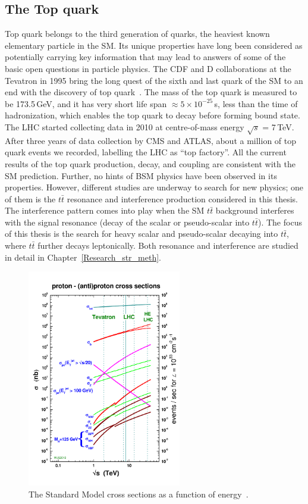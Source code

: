\subsection{The Top quark}\label{subsec:top_quark}
Top quark belongs to the third generation of quarks, the heaviest known elementary particle in the SM. Its unique properties have long been considered as potentially carrying key information that may lead to answers of some of the basic open questions in particle physics. The CDF and D collaborations at the Tevatron in 1995 bring the long quest of the sixth and last quark of the SM to an end with the discovery of top quark~\cite{top_quark}. The mass of the top quark is measured to be 173.5\,GeV, and it has very short life span $\approx 5 \times 10^{-25}$\,s, less than the time of hadronization, which enables the top quark to decay before forming bound state. The LHC started collecting data in 2010 at centre-of-mass energy $\sqrt{s}$ = 7\,TeV. After three years of data collection by CMS and ATLAS, about a million of top quark events we recorded, labelling the LHC as “top factory”. All the current results of the top quark production, decay, and coupling are consistent with the SM prediction. Further, no hints of BSM physics have been observed in its properties. However, different studies are underway to search for new physics; one of them is the $t\bar{t}$ resonance and interference production considered in this thesis. The interference pattern comes into play when the SM $t\bar{t}$ background interferes with the signal resonance (decay of the scalar or pseudo-scalar into $t\bar{t}$). The focus of this thesis is the search for heavy scalar and pseudo-scalar decaying into $t\bar{t}$, where $t\bar{t}$ further decays leptonically. Both resonance and interference are studied in detail in Chapter~\ref{Research_str_meth}. 
\begin{figure}[h]
\centering
\includegraphics[width=0.6\textwidth]{fig/sm_beyond/crosssections2012HE_v4.pdf}
\caption{\label{fig:lhclumi_plot}The Standard Model cross sections as a function of energy~\cite{lhclumi_plot}.}
\end{figure}
